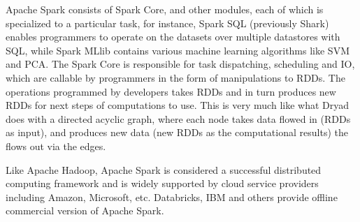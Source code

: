 \documentclass{article}
\begin{document}
Apache Spark consists of Spark Core, and other modules, each of which is specialized to a particular task, for instance, Spark SQL (previously Shark) enables programmers to operate on the datasets over multiple datastores with SQL, while Spark MLlib contains various machine learning algorithms like SVM and PCA.\cite{wiki:spark} The Spark Core is responsible for task dispatching, scheduling and IO, which are callable by programmers in the form of manipulations to RDDs. The operations programmed by developers takes RDDs and in turn produces new RDDs for next steps of computations to use. This is very much like what Dryad does with a directed acyclic graph, where each node takes data flowed in (RDDs as input), and produces new data (new RDDs as the computational results) the flows out via the edges.

Like Apache Hadoop, Apache Spark is considered a successful distributed computing framework and is widely supported by cloud service providers including Amazon, Microsoft, etc. Databricks, IBM and others provide offline commercial version of Apache Spark.


\nocite{*}

\end{document}
